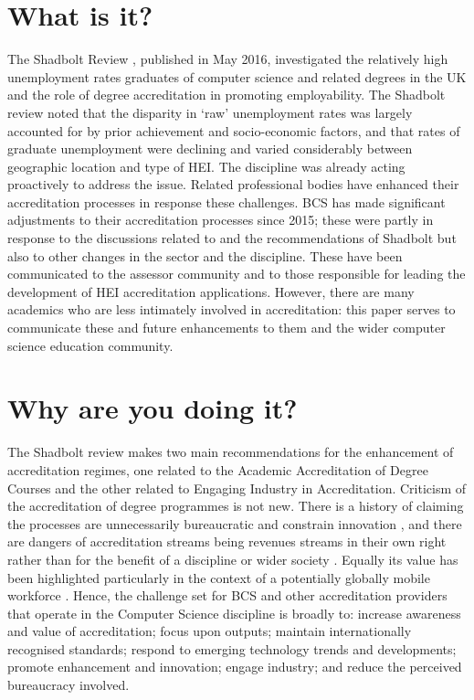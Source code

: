 \documentclass[sigconf]{acmart}
\begin{document}
\section {What is it?}
The Shadbolt Review \cite{shadbolt2016shadbolt}, published in May
2016, investigated the relatively high unemployment rates graduates of
computer science and related degrees in the UK and the role of degree
accreditation in promoting employability. The Shadbolt review noted
that the disparity in `raw' unemployment rates was largely accounted
for by prior achievement and socio-economic factors, and that rates of
graduate unemployment were declining and varied considerably between
geographic location and type of HEI. The discipline was already acting
proactively to address the issue.  Related professional bodies have
enhanced their accreditation processes in response these
challenges. BCS has made significant adjustments to their
accreditation processes since 2015; these were partly in response to
the discussions related to and the recommendations of Shadbolt but
also to other changes in the sector and the discipline.  These have
been communicated to the assessor community and to those responsible
for leading the development of HEI accreditation
applications. However, there are many academics who are less
intimately involved in accreditation: this paper serves to communicate
these and future enhancements to them and the wider computer science
education community.

\section {Why are you doing it?}	
The Shadbolt review \cite[p.~8]{shadbolt2016shadbolt} makes two main
recommendations for the enhancement of accreditation regimes, one
related to the Academic Accreditation of Degree Courses and the other
related to Engaging Industry in Accreditation. Criticism of the
accreditation of degree programmes is not new. There is a history of
claiming the processes are unnecessarily bureaucratic and constrain
innovation \cite{Harvey2004}, and there are dangers of accreditation
streams being revenues streams in their own right rather than for the
benefit of a discipline or wider society \cite{Knight_2015}. Equally
its value has been highlighted particularly in the context of a
potentially globally mobile workforce \cite{Knight_2015}. Hence, the
challenge set for BCS and other accreditation providers that operate
in the Computer Science discipline is broadly to: increase awareness
and value of accreditation; focus upon outputs; maintain
internationally recognised standards; respond to emerging technology
trends and developments; promote enhancement and innovation; engage
industry; and reduce the perceived bureaucracy involved.
\end{document}
